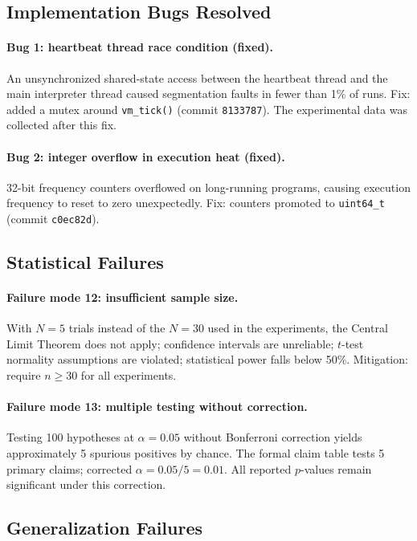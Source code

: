 \subsection{Implementation Bugs Resolved}

\paragraph{Bug 1: heartbeat thread race condition (fixed).}
An unsynchronized shared-state access between the heartbeat thread and the
main interpreter thread caused segmentation faults in fewer than 1\% of
runs. Fix: added a mutex around \texttt{vm\_tick()} (commit
\texttt{8133787}). The experimental data was collected after this fix.

\paragraph{Bug 2: integer overflow in execution heat (fixed).}
32-bit frequency counters overflowed on long-running programs, causing
execution frequency to reset to zero unexpectedly. Fix: counters promoted
to \texttt{uint64\_t} (commit \texttt{c0ec82d}).

\subsection{Statistical Failures}

\paragraph{Failure mode 12: insufficient sample size.}
With $N = 5$ trials instead of the $N = 30$ used in the experiments, the
Central Limit Theorem does not apply; confidence intervals are unreliable;
$t$-test normality assumptions are violated; statistical power falls below
50\%. Mitigation: require $n \geq 30$ for all experiments.

\paragraph{Failure mode 13: multiple testing without correction.}
Testing 100 hypotheses at $\alpha = 0.05$ without Bonferroni correction
yields approximately 5 spurious positives by chance. The formal claim table
tests 5 primary claims; corrected $\alpha = 0.05 / 5 = 0.01$. All reported
$p$-values remain significant under this correction.

\subsection{Generalization Failures}

